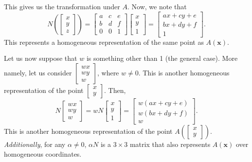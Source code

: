 \documentclass[letterpaper]{article}
\begin{document}
This gives us the transformation under $A$. Now, we note that 
\[N\left(\begin{bmatrix}
    x \\ y \\ z
\end{bmatrix}\right) = \begin{bmatrix}
    a & c & e \\
    b & d & f \\ 
    0 & 0 & 1
\end{bmatrix} \begin{bmatrix}
    x \\ y \\ 1
\end{bmatrix} = \begin{bmatrix}
    ax + cy + e \\ 
    bx + dy + f \\ 
    1
\end{bmatrix}.\]
This represents a homogeneous representation of the same point as $A(\mathbf{x})$.

\bigskip 

Let us now suppose that $w$ is something other than 1 (the general case). More namely, let us consider $\begin{bmatrix}
    wx \\ wy \\ w
\end{bmatrix}$, where $w \neq 0$. This is another homogeneous representation of the point $\begin{bmatrix}
    x \\ y
\end{bmatrix}$. Then, 
\[N \begin{bmatrix}
    wx \\ wy \\ w
\end{bmatrix} = w N\begin{bmatrix}
    x \\ y \\ 1
\end{bmatrix} = \begin{bmatrix}
    w(ax + cy + e) \\ 
    w(bx + dy + f) \\ 
    w
\end{bmatrix}.\]
This is another homogeneous representation of the point $A\left(\begin{bmatrix}
    x \\ y
\end{bmatrix}\right)$. \emph{Additionally}, for any $\alpha \neq 0$, $\alpha N$ is a $3 \times 3$ matrix that also represents $A(\mathbf{x})$ over homogeneous coordinates. 
\end{document}
